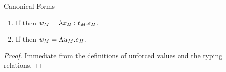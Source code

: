 \begin{lemma}{Canonical Forms}
\begin{enumerate}
\item If \judem{\env}{\varvalfm}{\tyfun{\first{\vartym}}{\second{\vartym}}} then $w_{\mathit{M}} = \lambda x_{\mathit{H}} : t_{\mathit{M}} . e_{\mathit{H}}$.


\item If \judem{\env}{\varvalfm}{\tyfor{\tyvarm}{\vartym}} then $w_{\mathit{M}} = \Lambda u_{\mathit{M}} . e_{\mathit{H}}$.

\end{enumerate}

\begin{proof}

Immediate from the definitions of unforced values and the typing relations.

\end{proof}

\end{lemma}
